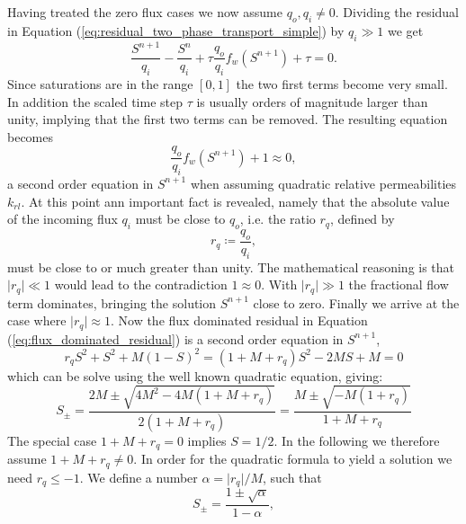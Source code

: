 Having treated the zero flux cases we now assume $q_o,q_i \neq 0$. Dividing the residual in Equation (\ref{eq:residual_two_phase_transport_simple}) by $q_i \gg 1$ we get
\begin{equation*}
\frac{S^{n+1}}{q_i} - \frac{S^n}{q_i} + \tau \frac{q_o}{q_i} f_w(S^{n+1}) + \tau = 0.
\end{equation*}
Since saturations are in the range $[0,1]$ the two first terms become very small. In addition the scaled time step $\tau$ is usually orders of magnitude larger than unity, implying that the first two terms can be removed.  The resulting equation becomes
\begin{equation} \label{eq:flux_dominated_residual}
\frac{q_o}{q_i} f_w(S^{n+1}) + 1 \approx 0,
\end{equation}
a second order equation in $S^{n+1}$ when assuming quadratic relative permeabilities $k_{rl}$. At this point ann important fact is revealed, namely that the absolute value of the incoming flux $q_i$ must be close to $q_o$, i.e. the ratio $r_q$, defined by
\begin{equation*}
r_q \coloneqq \frac{q_o}{q_i},
\end{equation*}
must be close to or much greater than unity. The mathematical reasoning is that $\lvert r_q \rvert \ll 1$ would lead to the contradiction $1 \approx 0$. With $\lvert r_q \rvert \gg 1$ the fractional flow term dominates, bringing the solution $S^{n+1}$ close to zero. Finally we arrive at the case where $\lvert r_q \rvert \approx 1$. Now the flux dominated residual in Equation (\ref{eq:flux_dominated_residual}) is a second order equation in $S^{n+1}$,
\begin{equation*}
r_q S^2 +  S^2 + M(1-S)^2 = (1+M+r_q)S^2 - 2MS + M = 0
\end{equation*}
which can be solve using the well known quadratic equation, giving:
\begin{equation*}
S_{\pm} = \frac{2M \pm \sqrt{4M^2 - 4 M (1+M+r_q)}}{2(1+M+r_q)} = \frac{M \pm \sqrt{ - M (1+r_q)}}{1+M+r_q}
\end{equation*}
The special case $1+M+r_q = 0$ implies $S = 1/2$. In the following we therefore assume $1+M+r_q \neq 0$. In order for the quadratic formula to yield a solution we need $r_q \leq -1$. We define a number $\alpha = \lvert r_q \rvert / M$, such that
\begin{equation*}
S_{\pm} = \frac{1 \pm \sqrt{\alpha}}{1 - \alpha},
\end{equation*}
